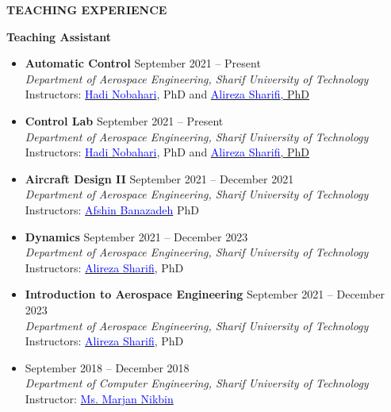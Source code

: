 \documentclass[12pt]{article}
\begin{document}
\begin{center}
	{\noindent \bfseries TEACHING EXPERIENCE}
\end{center}
{\bfseries Teaching Assistant}
\begin{itemize}
	\item {\bfseries Automatic Control}
	 \hfill September 2021 -- Present \\
	\textit{Department of Aerospace Engineering, Sharif University of Technology}\\
	Instructors: \href{https://ae.sharif.edu/~portal/faculty/1091235256}{\textcolor{blue}{Hadi Nobahari}}, PhD and \href{https://ae.sharif.edu/~portal/faculty/1730782165}{\textcolor{blue}{Alireza Sharifi}, PhD}
	\item {\bfseries Control Lab}
	 \hfill September 2021 -- Present \\
	\textit{Department of Aerospace Engineering, Sharif University of Technology}\\
	Instructors: \href{https://ae.sharif.edu/~portal/faculty/1091235256}{\textcolor{blue}{Hadi Nobahari}}, PhD and \href{https://ae.sharif.edu/~portal/faculty/1730782165}{\textcolor{blue}{Alireza Sharifi}, PhD}
	\item {\bfseries Aircraft Design II}
	 \hfill September 2021 -- December 2021 \\
	\textit{Department of Aerospace Engineering, Sharif University of Technology}\\
	Instructors: \href{http://ae.sharif.edu/~portal/faculty/1014037799}{\textcolor{blue}{Afshin Banazadeh}} PhD
	\item {\bfseries Dynamics}
	 \hfill September 2021 -- December 2023 \\
	\textit{Department of Aerospace Engineering, Sharif University of Technology}\\
	Instructors: \href{https://ae.sharif.edu/~portal/faculty/1730782165}{\textcolor{blue}{Alireza Sharifi}}, PhD
	\item {\bfseries Introduction to Aerospace Engineering}
	 \hfill September 2021 -- December 2023 \\
	\textit{Department of Aerospace Engineering, Sharif University of Technology}\\
	Instructors: \href{https://ae.sharif.edu/~portal/faculty/1730782165}{\textcolor{blue}{Alireza Sharifi}}, PhD

	\item {}
	\hfill September 2018 -- December 2018 \\
   \textit{Department of Computer Engineering, Sharif University of Technology}\\
   \noindent Instructor: \href{https://www.linkedin.com/in/marjan-nikbin-a27451111}{\textcolor{blue}{Ms. Marjan Nikbin}}


\end{itemize}
\end{document}
